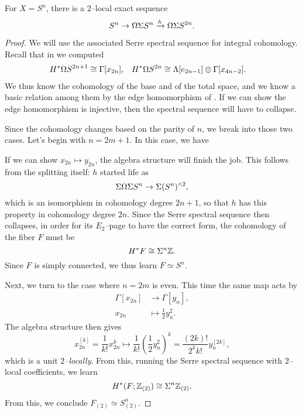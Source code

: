 \begin{theorem}\label{HopfFiberOfLoopsSn}
For $X = S^n$, there is a $2$--local exact sequence \[S^n \to \Omega \Sigma S^n \xrightarrow h \Omega \Sigma S^{2n}.\]
\end{theorem}
\begin{proof}
We will use the associated Serre spectral sequence for integral cohomology.
Recall that in  we computed
\begin{align*}
H^* \Omega S^{2n+1} & \cong \Gamma[x_{2n}], &
H^* \Omega S^{2n} & \cong \Lambda[e_{2n-1}] \otimes \Gamma[x_{4n-2}].
\end{align*}
We thus know the cohomology of the base and of the total space, and we know a basic relation among them by the edge homomorphism of .
If we can show the edge homomorphism is injective,
then the spectral sequence will have to collapse.

Since the cohomology changes based on the parity of $n$, we break into those two cases.
Let's begin with $n = 2m + 1$.
In this case, we have
\begin{center}
\end{center}
If we can show $x_{2n} \mapsto y_{2n}$, the algebra structure will finish the job.
This follows from the splitting itself: $h$ started life as \[\Sigma \Omega \Sigma S^n \to \Sigma(S^n)^{\wedge 2},\] which is an isomorphism in cohomology degree $2n+1$, so that $h$ has this property in cohomology degree $2n$.
Since the Serre spectral sequence then collapses, in order for its $E_2$--page to have the correct form, the cohomology of the fiber $F$ must be \[H^* F \cong \Sigma^n \mathbb Z.\]
Since $F$ is simply connected, we thus learn $F \simeq S^n$.

Next, we turn to the case where $n = 2m$ is even.
This time the same map acts by
\begin{align*}
\Gamma[x_{2n}] & \to \Gamma[y_n], \\
x_{2n} & \mapsto \frac{1}{2} y_n^2.
\end{align*}
The algebra structure then gives \[x_{2n}^{[k]} = \frac{1}{k!} x_{2n}^k \mapsto \frac{1}{k!} \left(\frac{1}{2} y_n^2\right)^k = \frac{(2k)!}{2^k k!} y_n^{[2k]},\] which is a unit \emph{$2$--locally}.
From this, running the Serre spectral sequence with $2$--local coefficients, we learn \[H^*(F; \mathbb Z_{(2)}) \cong \Sigma^n \mathbb Z_{(2)}.\]
From this, we conclude $F_{(2)} \simeq S^n_{(2)}$.
\end{proof}

